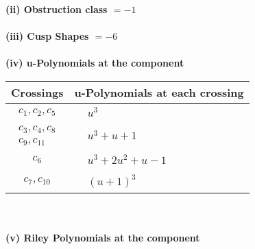 \documentclass[1p]{elsarticle_modified}
\theoremstyle{definition}
\begin{document}
\flushleft \textbf{(ii) Obstruction class $= -1$}\\~\\
\flushleft \textbf{(iii) Cusp Shapes $= -6$}\\~\\
\newpage\renewcommand{\arraystretch}{1}
\flushleft \textbf{(iv) u-Polynomials at the component}\newline \\
\begin{tabular}{m{50pt}|m{274pt}}
Crossings & \hspace{64pt}u-Polynomials at each crossing \\
\hline $$\begin{aligned}c_{1},c_{2},c_{5}\end{aligned}$$&$\begin{aligned}
&u^3
\end{aligned}$\\
\hline $$\begin{aligned}c_{3},c_{4},c_{8}\\c_{9},c_{11}\end{aligned}$$&$\begin{aligned}
&u^3+u+1
\end{aligned}$\\
\hline $$\begin{aligned}c_{6}\end{aligned}$$&$\begin{aligned}
&u^3+2 u^2+u-1
\end{aligned}$\\
\hline $$\begin{aligned}c_{7},c_{10}\end{aligned}$$&$\begin{aligned}
&(u+1)^3
\end{aligned}$\\
\hline
\end{tabular}\\~\\
\newpage\renewcommand{\arraystretch}{1}
\flushleft \textbf{(v) Riley Polynomials at the component}\newline \\
\end{document}
